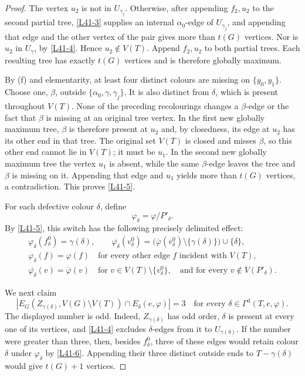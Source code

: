 \documentclass[11pt]{article}
\theoremstyle{definition}
\newcommand{\Dcol}{\Gamma^{\mathrm d}}
\newcommand{\set}[1]{\{#1\}}
\newcommand{\comp}{\mathbin{\setminus}}
\begin{document}
\begin{proof}
The vertex $u_2$ is not in $U_{\gamma_j}$. Otherwise, after appending
$f_2,u_2$ to the second partial tree, \eqref{L41-3} supplies an internal
$\alpha_0$-edge of $U_{\gamma_j}$, and appending that edge and the other
vertex of the pair gives more than $t(G)$ vertices. Nor is $u_2$ in
$U_\gamma$, by \eqref{L41-4}. Hence $u_2\notin V(T)$. Append
$f_2,u_2$ to both partial trees. Each resulting tree has exactly $t(G)$
vertices and is therefore globally maximum.

By (f) and elementarity, at least four distinct
colours are missing on $\set{y_0,y_1}$. Choose one, $\beta$, outside
$\set{\alpha_0,\gamma,\gamma_j}$. It is also distinct from $\delta$,
which is present throughout $V(T)$. None of the preceding recolourings
changes a $\beta$-edge or the fact that $\beta$ is missing at an original
tree vertex. In the first new globally maximum tree, $\beta$ is therefore
present at $u_2$ and, by closedness, its edge at $u_2$ has its other end in
that tree. The original set $V(T)$ is closed and misses $\beta$, so this
other end cannot lie in $V(T)$; it must be $u_1$. In the second new
globally maximum tree the vertex $u_1$ is absent, while the same
$\beta$-edge leaves the tree and $\beta$ is missing on it. Appending that
edge and $u_1$ yields more than $t(G)$ vertices, a contradiction. This
proves \eqref{L41-5}.

For each defective colour $\delta$, define
\[
 \varphi_\delta=\varphi/P'_\delta.
\]
By \eqref{L41-5}, this switch has the following precisely delimited effect:
\begin{equation}
\begin{gathered}
 \varphi_\delta(f^0_\delta)=\gamma(\delta),\qquad
 \overline{\varphi_\delta}(v^0_\delta)=
 \bigl(\overline\varphi(v^0_\delta)\comp\set{\gamma(\delta)}\bigr)
       \cup\set{\delta},\\
 \varphi_\delta(f)=\varphi(f)
 \quad\text{for every other edge $f$ incident with $V(T)$},\\
 \overline{\varphi_\delta}(v)=\overline\varphi(v)
 \quad\text{for }v\in V(T)\comp\set{v^0_\delta},
 \quad\text{and for every }v\notin V(P'_\delta).
\end{gathered}
 \tag{6}\label{L41-6}
\end{equation}

We next claim
\begin{equation}
 \left|E_G(Z_{\gamma(\delta)},V(G)\comp V(T))
       \cap E_\delta(e,\varphi)\right|=3
 \quad\text{for every }\delta\in\Dcol(T,e,\varphi).
 \tag{7}\label{L41-7}
\end{equation}
The displayed number is odd. Indeed, $Z_{\gamma(\delta)}$ has odd order,
$\delta$ is present at every one of its vertices, and \eqref{L41-4}
excludes $\delta$-edges from it to $U_{\gamma(\delta)}$. If the number were
greater than three, then, besides $f^0_\delta$, three of these edges would
retain colour $\delta$ under $\varphi_\delta$ by \eqref{L41-6}. Appending
their three distinct outside ends to $T-\gamma(\delta)$ would give
$t(G)+1$ vertices.


\end{proof}
\end{document}

